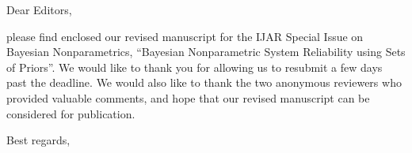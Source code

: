 \documentclass[12pt]{letter}
\date{06.07.2016}
\begin{document}
\longindentation=0pt
\begin{letter}{}
\opening{Dear Editors,}
please find enclosed our revised manuscript for the IJAR Special Issue on Bayesian Nonparametrics,
``Bayesian Nonparametric System Reliability using Sets of Priors''.
We would like to thank you for allowing us to resubmit a few days past the deadline.
We would also like to thank the two anonymous reviewers who provided valuable comments,
and hope that our revised manuscript can be considered for publication.
\closing{Best regards,}
\end{letter}
\end{document}
